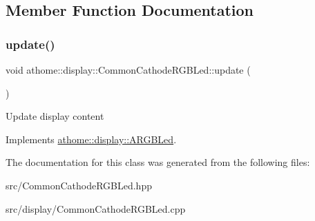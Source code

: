 \subsection{Member Function Documentation}
\mbox{\label{classathome_1_1display_1_1_common_cathode_r_g_b_led_ab78ab6aef619d8e0941dd11d4cfbb545}} 
\subsubsection{\texorpdfstring{update()}{update()}}
{\footnotesize\ttfamily void athome\+::display\+::\+Common\+Cathode\+R\+G\+B\+Led\+::update (\begin{DoxyParamCaption}{ }\end{DoxyParamCaption})\hspace{0.3cm}{\ttfamily [virtual]}}

Update display content 

Implements \mbox{\hyperlink{classathome_1_1display_1_1_a_r_g_b_led_a725ceca0c01735daa9c95148baf075ab}{athome\+::display\+::\+A\+R\+G\+B\+Led}}.



The documentation for this class was generated from the following files\+:\begin{DoxyCompactItemize}
\item 
src/Common\+Cathode\+R\+G\+B\+Led.\+hpp\item 
src/display/Common\+Cathode\+R\+G\+B\+Led.\+cpp\end{DoxyCompactItemize}
